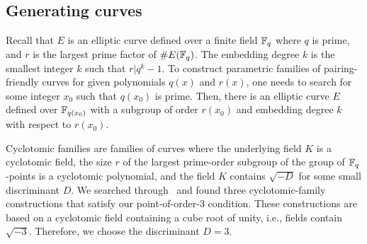 

\subsection{Generating curves}
\label{subsec:gencurves}

Recall that $E$ is an elliptic curve defined over a finite field $\mathbb{F}_{q}$ where $q$ is prime,
and $r$ is the largest prime factor of $\# E(\mathbb{F}_{q})$.
The embedding degree $k$ is the smallest integer $k$ such that $r | q^k -1$.
To construct parametric families of pairing-friendly curves for given polynomials $q(x)$ and $r(x)$,
one needs to search for some integer $x_0$ such that $q(x_0)$ is prime.
Then, there is an elliptic curve $E$ defined over $\mathbb{F}_{q(x_0)}$ with a subgroup
of order $r(x_0)$ and embedding degree $k$ with respect to $r(x_0)$.

Cyclotomic families are families of curves where the underlying field $K$ is a cyclotomic field,
the size $r$ of the largest prime-order subgroup of the group of $\mathbb{F}_{q}$-points is a cyclotomic polynomial,
and the field $K$ contains $\sqrt{-D}$ for some small discriminant $D$.
We searched through~\cite{2010/freeman} and found three cyclotomic-family constructions that satisfy our point-of-order-3 condition.
These constructions are based on a cyclotomic field containing a cube root of unity,
i.e., fields contain $\sqrt{-3}$.
Therefore, we choose the discriminant $D = 3$.

